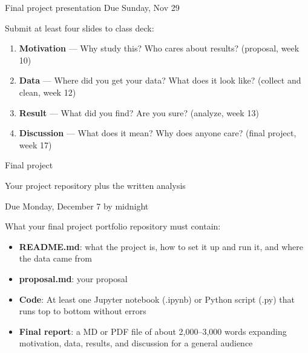 \documentclass[9pt,aspectratio=169]{beamer}
\begin{document}
\begin{frame}{Final project presentation}
    Due Sunday, Nov 29
    
    \bigskip
    
    Submit at least four slides to class deck:
    \begin{enumerate}
        \item \textbf{Motivation} --- Why study this? Who cares about results? (proposal, week 10)
        \item \textbf{Data} --- Where did you get your data? What does it look like? (collect and clean, week 12)
        \item \textbf{Result} --- What did you find? Are you sure? (analyze, week 13)
        \item \textbf{Discussion} --- What does it mean? Why does anyone care? (final project, week 17)
    \end{enumerate}
    
\end{frame}

\begin{frame}{Final project}

    Your project repository plus the written analysis
    
    \bigskip
    
    Due Monday, December 7 by midnight

    \bigskip

    What your final project portfolio repository must contain:

    \begin{itemize}
        \item \textbf{README.md}: what the project is, how to set it up and run it, and where the data came from
        \item \textbf{proposal.md}: your proposal
        \item \textbf{Code}: At least one Jupyter notebook (.ipynb) or Python script (.py) that runs top to bottom without errors
        \item \textbf{Final report}: a MD or PDF file of about 2,000–3,000 words expanding motivation, data, results, and discussion for a general audience
    \end{itemize}
\end{frame}
\end{document}
